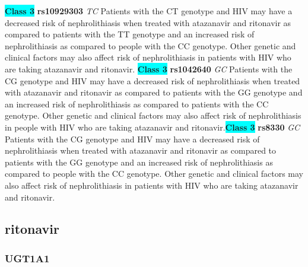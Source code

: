 \documentclass{book}
\begin{document}
\begin{center}
\textbf{\colorbox{cyan} {Class 3}} \textbf{ rs10929303 } \textit{ TC }
Patients with the CT genotype and HIV may have a decreased risk of nephrolithiasis when treated with atazanavir and ritonavir as compared to patients with the TT genotype and an increased risk of nephrolithiasis as compared to people with the CC genotype. Other genetic and clinical factors may also affect risk of nephrolithiasis in patients with HIV who are taking atazanavir and ritonavir. \textbf{\colorbox{cyan} {Class 3}} \textbf{ rs1042640 } \textit{ GC }
Patients with the CG genotype and HIV may have a decreased risk of nephrolithiasis when treated with atazanavir and ritonavir as compared to patients with the GG genotype and an increased risk of nephrolithiasis as compared to patients with the CC genotype. Other genetic and clinical factors may also affect risk of nephrolithiasis in people with HIV who are taking atazanavir and ritonavir.\textbf{\colorbox{cyan} {Class 3}} \textbf{ rs8330 } \textit{ GC }
Patients with the CG genotype and HIV may have a decreased risk of nephrolithiasis when treated with atazanavir and ritonavir as compared to patients with the GG genotype and an increased risk of nephrolithiasis as compared to people with the CC genotype. Other genetic and clinical factors may also affect risk of nephrolithiasis in patients with HIV who are taking atazanavir and ritonavir.


\end{center}\subsection{ ritonavir }


\subsubsection{ UGT1A1 }
\end{document}
